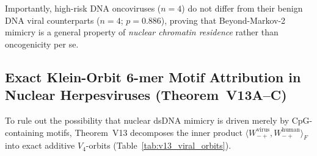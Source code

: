 \documentclass[11pt, a4paper]{article}
\DeclareRobustCommand{\_}{\textunderscore\allowbreak}
\begin{document}
Importantly, high-risk DNA oncoviruses ($n = 4$) do not differ from their benign DNA viral counterparts ($n = 4$; $p = 0.886$), proving that Beyond-Markov-2 mimicry is a general property of \emph{nuclear chromatin residence} rather than oncogenicity per se.

\subsection{Exact Klein-Orbit 6-mer Motif Attribution in Nuclear Herpesviruses (Theorem~V13A--C)}

To rule out the possibility that nuclear dsDNA mimicry is driven merely by CpG-containing motifs, Theorem~V13 decomposes the inner product $\langle W_{-+}^{\text{virus}}, W_{-+}^{\text{human}} \rangle_F$ into exact additive $V_4$-orbits (Table~\ref{tab:v13_viral_orbits}).
\end{document}
